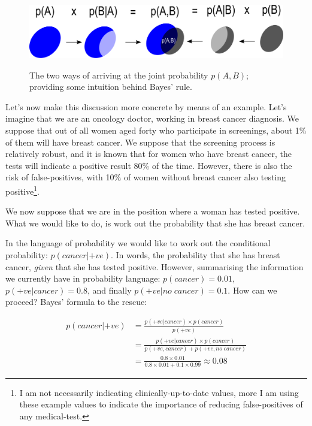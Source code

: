 \documentclass[11pt,fullpage]{book}
\begin{document}
\begin{figure}
\centering
\scalebox{0.4} 
{\includegraphics{Probability_BayesianIntuition.pdf}}
\caption{The two ways of arriving at the joint probability $p(A,B)$; providing some intuition behind Bayes' rule.}\label{fig:Probability_BayesianIntuition}
\end{figure}

Let's now make this discussion more concrete by means of an example. Let's imagine that we are an oncology doctor, working in breast cancer diagnosis. We suppose that out of all women aged forty who participate in screenings, about 1\% of them will have breast cancer. We suppose that the screening process is relatively robust, and it is known that for women who have breast cancer, the tests will indicate a positive result 80\% of the time. However, there is also the risk of false-positives, with 10\% of women without breast cancer also testing positive\footnote{I am not necessarily indicating clinically-up-to-date values, more I am using these example values to indicate the importance of reducing false-positives of any medical-test.}.

We now suppose that we are in the position where a woman has tested positive. What we would like to do, is work out the probability that she has breast cancer.

In the language of probability we would like to work out the conditional probability: $p(cancer|+ve)$. In words, the probability that she has breast cancer, \textit{given} that she has tested positive. However, summarising the information we currently have in probability language: $p(cancer)=0.01$, $p(+ve|cancer)=0.8$, and finally $p(+ve|no\; cancer) = 0.1$. How can we proceed? Bayes' formula to the rescue:

\begin{equation}\label{eq:Probability_bayesBreastCancer}
\begin{align}
p(cancer|+ve) &= \frac{p(+ve|cancer)\times p(cancer)}{p(+ve)}\\
&= \frac{p(+ve|cancer)\times p(cancer)}{p(+ve,cancer)+p(+ve,no\;cancer)}\\
&= \frac{0.8\times 0.01}{0.8\times 0.01 + 0.1\times 0.99} \approx 0.08
\end{align}
\end{equation}
\end{document}
